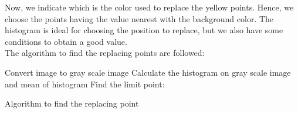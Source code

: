 Now, we indicate which is the color used to replace the yellow points. Hence, we choose the points having the value nearest with the background color. The histogram is ideal for choosing the position to replace, but we also have some conditions to obtain a good value.\\
The algorithm to find the replacing points are 
followed:\\
\IncMargin{1em}
\begin{algorithm}[H]
\Indm 
{}
\Indp
Convert image to gray scale image\;
Calculate the histogram on gray scale image and mean of histogram\;
Find the limit point:\;

\caption{Algorithm to find the replacing point}
\end{algorithm}\DecMargin{1em}
